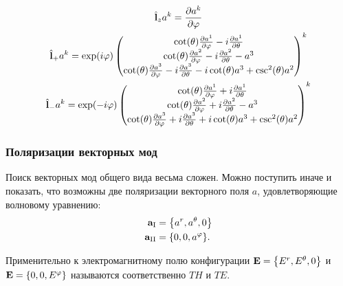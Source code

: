 \documentclass{beamer}
\begin{document}

    \begin{frame}

        \begin{equation}\begin{gathered}\label{eq:killing_operators_vect}
            \hat{\mathbf{l}}_z a^k = \pdv{a^k}{\varphi} \\
            \hat{\mathbf{l}}_{+} a^k = \exp(i\varphi) \begin{pmatrix}
                \cot(\theta) \pdv{a^1}{\varphi} - i \pdv{a^1}{\theta} \\
                \cot(\theta) \pdv{a^2}{\varphi} - i \pdv{a^2}{\theta} - a^3 \\
                \cot(\theta) \pdv{a^3}{\varphi} - i \pdv{a^3}{\theta}
                    - i \cot(\theta) a^3 + \csc^2(\theta) a^2
            \end{pmatrix}^k \\
            \hat{\mathbf{l}}_{-} a^k = \exp(-i\varphi) \begin{pmatrix}
                \cot(\theta) \pdv{a^1}{\varphi} + i \pdv{a^1}{\theta} \\
                \cot(\theta) \pdv{a^2}{\varphi} + i \pdv{a^2}{\theta} - a^3 \\
                \cot(\theta) \pdv{a^3}{\varphi} + i \pdv{a^3}{\theta}
                    + i \cot(\theta) a^3 + \csc^2(\theta) a^2
            \end{pmatrix}^k
        \end{gathered}\end{equation}

    \end{frame}


    \begin{frame}\frametitle{Поляризации векторных мод}

        Поиск векторных мод общего вида весьма сложен. Можно поступить иначе и показать, что возможны две поляризации векторного поля $a$, удовлетворяющие волновому уравнению:
        \begin{equation}\begin{aligned}
            \vb{a}_{\mathrm{I}} &= \qty{ a^r, a^\theta, 0 } \\
            \vb{a}_{\mathrm{II}} &= \qty{ 0, 0, a^\varphi } .
        \end{aligned}\end{equation}

        Применительно к электромагнитному полю конфигурации $\vb{E} = \qty{ E^r, E^\theta, 0 }$ и $\vb{E} = \qty{ 0, 0, E^\varphi }$ называются соответственно $TH$ и $TE$.

    \end{frame}
\end{document}
